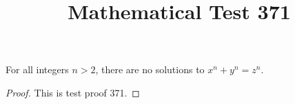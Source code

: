 \documentclass{amsart}
\begin{document}
\title{Mathematical Test 371}
\begin{theorem}
For all integers $n > 2$, there are no solutions to $x^n + y^n = z^n$.
\end{theorem}
\begin{proof}
This is test proof 371.
\end{proof}
\end{document}
